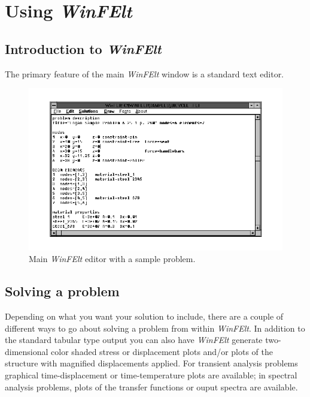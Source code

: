 
\newpage{\pagestyle{empty}\cleardoublepage}

\chapter{Using {\em WinFElt}}
\label{winfelt}

\section{Introduction to {\em WinFElt}}
\label{winfelt.intro}

The primary feature of the main {\em WinFElt} window is a standard text
editor.    
\begin{figure}
\begin{center}
 \includegraphics[width=5in]{figures/winfelt_main}
\end{center}
\caption{Main {\em WinFElt} editor with a sample problem.}
\label{winfelt.main}
\end{figure}

\section{Solving a problem}

Depending on what you want your solution to include, there are a couple
of different ways to go about solving a \felt{} problem from within
{\em WinFElt}.  In addition to the standard tabular type \felt{} output 
you can also have {\em WinFElt} generate
two-dimensional color shaded stress or displacement plots and/or plots 
of the structure with magnified displacements applied.  For transient 
analysis problems graphical time-displacement or time-temperature plots 
are available; in spectral analysis problems, plots of the transfer 
functions or ouput spectra are available.

